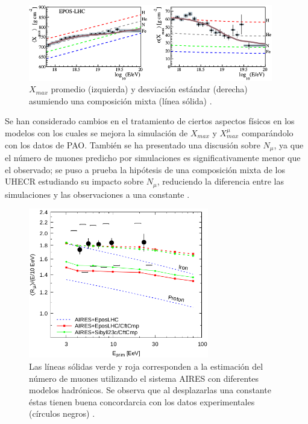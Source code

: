 \begin{figure}[h]
\centering
\includegraphics[width=0.95\textwidth]{Figuras/Xmax_PAO} 
\caption{$X_{max}$ promedio (izquierda) y desviación estándar (derecha) asumiendo una composición mixta (línea sólida) \cite{PAOcomposition}.}
\label{fig:Xmax}
\end{figure}	

Se han considerado cambios en el tratamiento de ciertos aspectos físicos en los modelos \cite{Ostapchenko2019} con los cuales se mejora la simulación de $X_{max}$ y $X_{max}^{\mu}$ comparándolo con los datos de PAO. También se ha presentado una discusión sobre $N_{\mu}$, ya que el número de muones predicho por simulaciones es significativamente menor que el observado; se puso a prueba la hipótesis de una composición mixta de los UHECR estudiando su impacto sobre $N_{\mu}$, reduciendo la diferencia entre las simulaciones y las observaciones a una constante \cite{Sciutto2019}.

\begin{figure}[h]
\centering
\includegraphics[width=0.7\textwidth]{Figuras/Nmu_Sciutto} 
\caption{Las líneas sólidas verde y roja corresponden a la estimación del número de muones utilizando el sistema AIRES con diferentes modelos hadrónicos. Se observa que al desplazarlas una constante éstas tienen buena concordarcia con los datos experimentales (círculos negros) \cite{Sciutto2019}.}
\label{fig:Nmu}
\end{figure}


\singlespace


